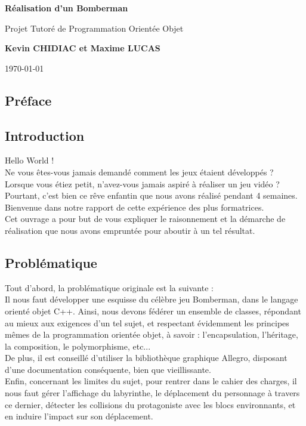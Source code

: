 \documentclass[a4paper]{report}
\begin{document}
\begin{titlepage}
	\begin{center}
		\vspace*{10cm}
	
		\textbf{\Huge Réalisation d'un Bomberman}
		
		\vspace{0.5cm}
		\LARGE{Projet Tutoré de Programmation Orientée Objet}
		
		\vspace{1.5cm}
		\textbf{Kevin CHIDIAC et Maxime LUCAS}
		
		\vfill
		
		\today	
	\end{center}
\end{titlepage}

\tableofcontents

\newpage


\begin{center}
\section{Préface}
\end{center}

\subsection{Introduction}
Hello World !\\
Ne vous êtes-vous jamais demandé comment les jeux étaient développés ?\\
Lorsque vous étiez petit, n’avez-vous jamais aspiré à réaliser un jeu vidéo ?\\
Pourtant, c’est bien ce rêve enfantin que nous avons réalisé pendant 4 semaines.\\
Bienvenue dans notre rapport de cette expérience des plus formatrices.\\
Cet ouvrage a pour but de vous expliquer le raisonnement et la démarche de réalisation que nous avons empruntée pour aboutir à un tel résultat.

\subsection{Problématique}
Tout d’abord, la problématique originale est la suivante :\\
Il nous faut développer une esquisse du célèbre jeu Bomberman, dans le langage orienté
objet C++. Ainsi, nous devons fédérer un ensemble de classes, répondant au mieux aux
exigences d’un tel sujet, et respectant évidemment les principes mêmes de la programmation orientée objet, à savoir : l’encapsulation, l’héritage, la composition, le
polymorphisme, etc...\\
De plus, il est conseillé d’utiliser la bibliothèque graphique Allegro, disposant d’une
documentation conséquente, bien que vieillissante.\\
Enfin, concernant les limites du sujet, pour rentrer dans le cahier des charges, il nous
faut gérer l’affichage du labyrinthe, le déplacement du personnage à travers ce dernier,
détecter les collisions du protagoniste avec les blocs environnants, et en induire l’impact sur son déplacement.\\
\end{document}
